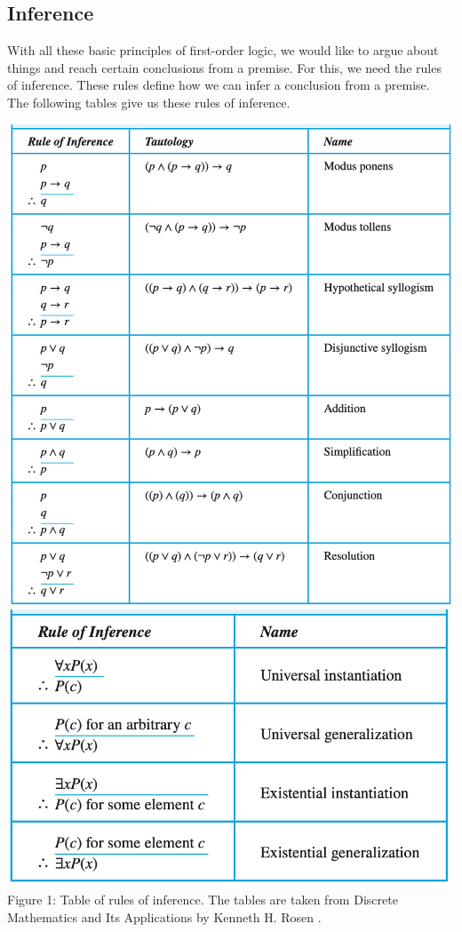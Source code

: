 \documentclass[12pt]{exam}
\begin{document}
\subsection*{Inference}
With all these basic principles of first-order logic, we would like to argue about things and reach certain conclusions from a premise.
For this, we need the rules of inference. These rules define how we can infer a conclusion from a premise.
The following tables give us these rules of inference.

\begin{center}
    \includegraphics[scale = 0.5]{inference_1.png}
    \\\includegraphics[scale = 0.66]{inference_2.png}
    \\Figure 1: Table of rules of inference. The tables are taken from Discrete Mathematics and Its Applications by Kenneth H. Rosen \cite{Rosen19}.
\end{center}
\end{document}
